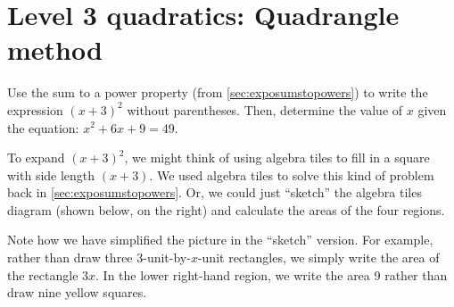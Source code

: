 \section{Level 3 quadratics: Quadrangle method}

\begin{boxedexplore}
Use the sum to a power property (from \cref{sec:exposumstopowers}) to write the expression $(x+3)^2$ without parentheses. Then, determine the value of $x$ given the equation: $x^2+6x+9 = 49$.
\end{boxedexplore} %

To expand $(x+3)^2$, we might think of using algebra tiles to fill in a square with side length $(x+3)$. We used algebra tiles to solve this kind of problem back in \cref{sec:exposumstopowers}. Or, we could just ``sketch'' the algebra tiles diagram (shown below, on the right) and calculate the areas of the four regions.

\begin{minipage}{0.49\linewidth}
\centering
{}
\end{minipage}
\begin{minipage}{0.49\textwidth}
\end{minipage}

Note how we have simplified the picture in the ``sketch'' version. For example, rather than draw three 3-unit-by-$x$-unit rectangles, we simply write the area of the rectangle $3x$. In the lower right-hand region, we write the area 9 rather than draw nine yellow squares.

